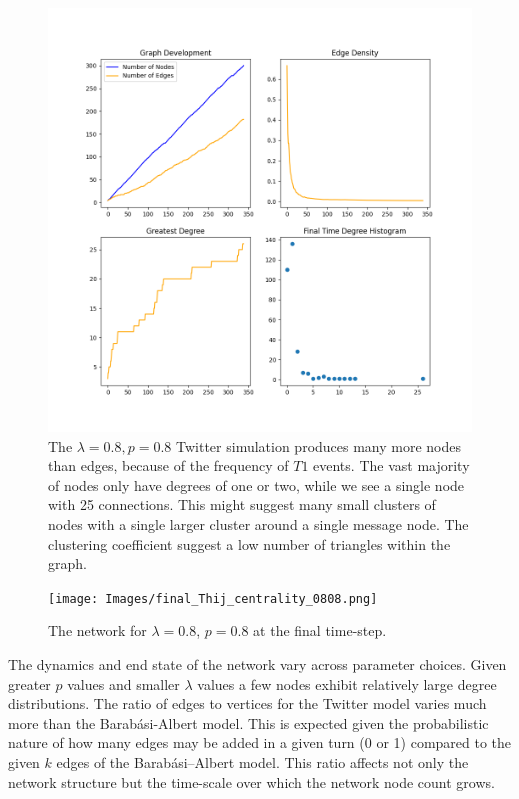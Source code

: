 \begin{figure}[h!]
    \includegraphics[width=14cm]{Images/twitter_sim_stats_3_0.8_0.8.png}
    \centering
    \caption{The $\lambda=0.8, p=0.8$ Twitter simulation produces many more nodes than 
    edges, because of the frequency of $T1$ events. The vast majority of nodes only 
    have degrees of one or two, while we see a single node with 25 connections.
    This might suggest many small clusters of nodes with a single larger
    cluster around a single message node. The clustering coefficient suggest a low number 
    of triangles within the graph.}
\end{figure}


\begin{figure}[h!]
    \texttt{[image: Images/final\_Thij\_centrality\_0808.png]}
    \centering
    \caption{The network for $\lambda=0.8$, $p=0.8$ at the final time-step.}
\end{figure}

\clearpage

The dynamics and end state of the network vary across parameter choices.
Given greater $p$ values and smaller $\lambda$ values a few nodes exhibit relatively large degree distributions. The ratio of edges to vertices for the Twitter model varies much more than the Barabási-Albert model.
This is expected given the probabilistic nature of how many edges may be added in a given turn (0 or 1) compared
to the given $k$ edges of the Barabási–Albert model. This ratio affects not only the network structure but the time-scale 
over which the network node count grows.

